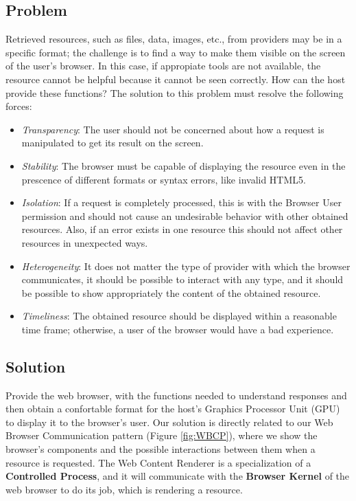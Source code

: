 \documentclass[prodmode,acmtecs]{acmsmall}
\begin{document}
  \subsection*{Problem}
  Retrieved resources, such as files, data, images, etc., from providers may be in a specific format; the challenge is to find a way to make them visible on the screen of the user's browser. In this case, if appropiate tools are not available, the resource cannot be helpful because it cannot be seen correctly. How can the host provide these functions? The solution to this problem must resolve the following forces:
  \begin{itemize}\leftskip0.8em
    \item \textit{Transparency}: The user should not be concerned about how a request is manipulated to get its result on the screen.
    \item \textit{Stability}: The browser must be capable of displaying the resource even in the prescence of different formats or syntax errors, like invalid HTML5.
    \item \textit{Isolation}: If a request is completely processed, this is with the Browser User permission and should not cause an undesirable behavior with other obtained resources. Also, if an error exists in one resource this should not affect other resources in unexpected ways.
    \item \textit{Heterogeneity}: It does not matter the type of provider with which the browser communicates, it should be possible to interact with any type, and it should be possible to show appropriately the content of the obtained resource.
    \item \textit{Timeliness}: The obtained resource should be displayed within a reasonable time frame; otherwise, a user of the browser would have a bad experience.
  \end{itemize}

  \subsection*{Solution}
  Provide the web browser, with the functions needed to understand responses and then obtain a confortable format for the host's Graphics Processor Unit (GPU) to display it to the browser's user. Our solution is directly related to our Web Browser Communication pattern \cite{silva2015} (Figure \ref{fig:WBCP}), where we show the browser's components and the possible interactions between them when a resource is requested. The Web Content Renderer is a specialization of a \textbf{Controlled Process}, and it will communicate with the \textbf{Browser Kernel} of the web browser to do its job, which is rendering a resource.
\end{document}

